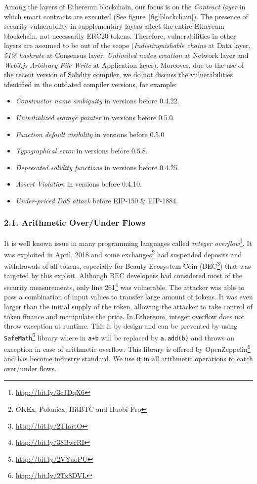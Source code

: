Among the layers of Ethereum blockchain, our focus is on the \textit{Contract layer} in which smart contracts are executed (See figure~\ref{fig:blockchain}). The presence of security vulnerability in supplementary layers affect the entire Ethereum blockchain, not necessarily ERC20 tokens. Therefore, vulnerabilities in other layers are assumed to be out of the scope (\eg \textit{Indistinguishable chains} at Data layer, \textit{51\% hashrate} at Consensus layer, \textit{Unlimited nodes creation} at Network layer and \textit{Web3.js Arbitrary File Write} at Application layer). Moreover, due to the use of the recent version of Solidity compiler, we do not discuss the vulnerabilities identified in the outdated compiler versions, for example:
\begin{itemize}[leftmargin=*]
	\item \textit{Constructor name ambiguity} in versions before 0.4.22.
	\item \textit{Uninitialized storage pointer} in versions before 0.5.0.
	\item \textit{Function default visibility} in versions before 0.5.0
	\item \textit{Typographical error} in versions before 0.5.8.
	\item \textit{Deprecated solidity functions} in versions before 0.4.25.
	\item \textit{Assert Violation} in versions before 0.4.10.
	\item \textit{Under-priced DoS attack} before EIP-150 \& EIP-1884.
\end{itemize}

\subsubsection*{2.1. Arithmetic Over/Under Flows}
It is well known issue in many programming languages called \textit{integer overflow}\footnote{\url{http://bit.ly/3cJDqX6}}. It was exploited in April, 2018 and some exchanges\footnote{OKEx, Poloniex, HitBTC and Huobi Pro} had suspended deposits and withdrawals of all tokens, especially for Beauty Ecosystem Coin (BEC\footnote{\url{http://bit.ly/2TIartO}}) that was targeted by this exploit. Although BEC developers had considered most of the security measurements, only line 261\footnote{\url{http://bit.ly/38BwcRI}} was vulnerable\cite{PeckShield}. The attacker was able to pass a combination of input values to transfer large amount of tokens\cite{Overflow}. It was even larger than the initial supply of the token, allowing the attacker to take control of token finance and manipulate the price. In Ethereum, integer overflow does not throw exception at runtime. This is by design and can be prevented by using \texttt{SafeMath}\footnote{\url{http://bit.ly/2VYuoPU}} library where in \texttt{a+b} will be replaced by \texttt{a.add(b)} and throws an exception in case of arithmetic overflow. This library is offered by OpenZeppelin\footnote{\url{http://bit.ly/2Tx8DVL}} and has become industry standard. We use it in all arithmetic operations to catch over/under flows.

